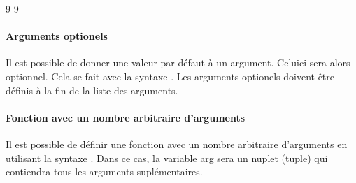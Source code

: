 \documentclass[letterpaper,10pt,english]{sphinxhowto}
\begin{document}
\begin{sphinxVerbatim}[commandchars=\\\{\}]
9
9
\end{sphinxVerbatim}


\paragraph{Arguments optionels}
\label{\detokenize{cours1_fonctions_cours:arguments-optionels}}
\sphinxAtStartPar
Il est possible de donner une valeur par défaut à un argument. Celui\sphinxhyphen{}ci sera alors optionnel. Cela se fait avec la syntaxe . Les arguments optionels doivent être définis à la fin de la liste des arguments.

\begin{sphinxVerbatim}[commandchars=\\\{\}]
  

 
 
\end{sphinxVerbatim}


\paragraph{Fonction avec un nombre arbitraire d’arguments}
\label{\detokenize{cours1_fonctions_cours:fonction-avec-un-nombre-arbitraire-d-arguments}}
\sphinxAtStartPar
Il est possible de définir une fonction avec un nombre arbitraire d’arguments en utilisant la syntaxe . Dans ce cas, la variable arg sera un n\sphinxhyphen{}uplet (tuple) qui contiendra tous les arguments suplémentaires.

\begin{sphinxVerbatim}[commandchars=\\\{\}]
   
     
     
     
    
   
\end{sphinxVerbatim}
\end{document}
